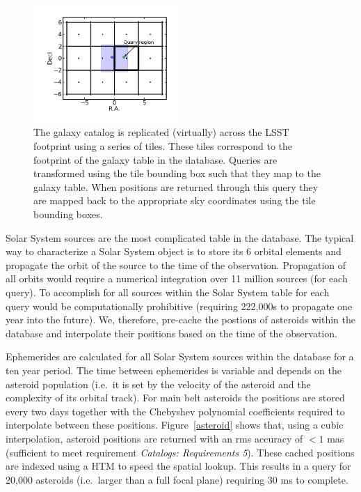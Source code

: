 \documentclass[]{article}
\begin{document}
\begin{figure}[h]
\centering
\includegraphics[width=0.5\textwidth]{validation_figures/basicDemo.png}
\caption{The galaxy catalog is replicated (virtually) across the LSST
  footprint using a series of tiles. These tiles correspond to the
  footprint of the galaxy table in the database. Queries are
  transformed using the tile bounding box such that they map to the
  galaxy table. When positions are returned through this query they
  are mapped back to the appropriate sky coordinates using the tile
  bounding boxes.}
\label{fig:galcoverage}
\end{figure}

Solar System sources are the most complicated table in the
database. The typical way to characterize a Solar System object is to
store its 6 orbital elements and propagate the orbit of the source to
the time of the observation. Propagation of all orbits would require a
numerical integration over 11 million sources (for each query). To
accomplish for all sources within the Solar System table for each
query would be computationally prohibitive (requiring 222,000s to
propagate one year into the future). We, therefore, pre-cache the
postions of asteroids within the database and interpolate their
positions based on the time of the observation.

Ephemerides are calculated for all Solar System sources within the
database for a ten year period. The time between ephemerides is
variable and depends on the asteroid population (i.e.\ it is set by
the velocity of the asteroid and the complexity of its orbital
track). For main belt asteroids the positions are stored every two
days together with the Chebyshev polynomial coefficients required to
interpolate between these positions. Figure~\ref{asteroid} shows that,
using a cubic interpolation, asteroid positions are returned with an
rms accuracy of $<1$ mas (sufficient to meet requirement {\it
  Catalogs: Requirements 5}). These cached positions are indexed using
a HTM to speed the spatial lookup. This results in a query for 20,000
asteroids (i.e.\ larger than a full focal plane) requiring 30 ms to
complete.
\end{document}
